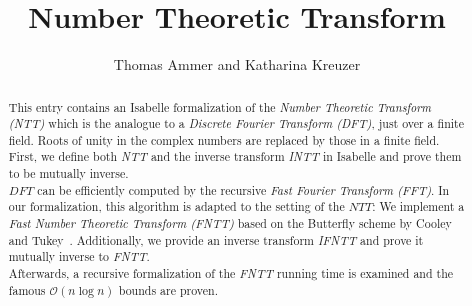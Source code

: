 \documentclass[11pt,a4paper]{article}
\begin{document}
\title{Number Theoretic Transform}
\author{Thomas Ammer and Katharina Kreuzer}
\maketitle

\begin{abstract}
\indent  This entry contains an Isabelle formalization of the \textit{Number Theoretic Transform (NTT)} which is the analogue to a \textit{Discrete Fourier Transform (DFT)}, just over a finite field. Roots of unity in the complex numbers are replaced by those in a finite field.\\
 \indent First, we define both \textit{NTT} and the inverse transform \textit{INTT} in Isabelle and prove them to be mutually inverse. \\
\indent $DFT$ can be efficiently computed by the recursive \textit{Fast Fourier Transform (FFT)}. In our formalization, this algorithm is adapted to the setting of the $NTT$: We implement a \textit{Fast Number Theoretic Transform (FNTT)} based on the Butterfly scheme by Cooley and Tukey~\parencite{Good1997}. Additionally, we provide an inverse transform \textit{IFNTT} and prove it mutually inverse to \textit{FNTT}.\\
\indent Afterwards, a recursive formalization of the \textit{FNTT} running time is examined and the famous $\mathcal{O}(n \log n)$ bounds are proven.
\end{abstract}

\pagebreak

\tableofcontents
\pagebreak
\end{document}
